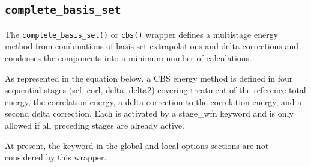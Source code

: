\subsection{\texttt{complete\_basis\_set}\label{wrapcbs}}

The \texttt{complete\_basis\_set()} or \texttt{cbs()} wrapper defines a
multistage energy method from combinations of basis set extrapolations
and delta corrections and condenses the components into a minimum
number of calculations.

As represented in the equation below, a CBS energy method is defined in
four sequential stages (scf, corl, delta, delta2) covering treatment of
the reference total energy, the correlation energy, a delta
correction to the correlation energy, and a second delta correction.
Each is activated by a stage\_wfn keyword and is only allowed if all
preceding stages are already active.

At present, the  keyword in the global and
local options sections are not considered by this wrapper.


